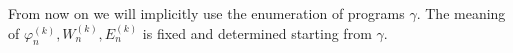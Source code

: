 \begin{observation}
  From now on we will implicitly use the enumeration of
programs $\gamma$. The meaning of
$\varphi_n^{(k)}, W_n^{(k)}, E_n^{(k)}$ is fixed and determined
starting from $\gamma$.
\end{observation}








